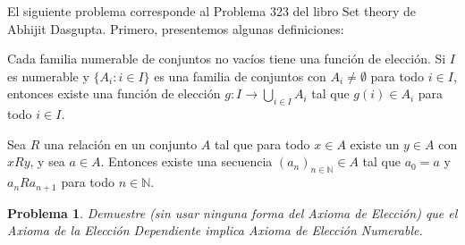 \documentclass[a4,10pt]{aleph-notas}
\newtheorem*{prob}{Problema}
\begin{document}
\encabezado

\noindent
El siguiente problema corresponde al Problema 323 del libro Set theory de Abhijit Dasgupta. Primero, presentemos algunas definiciones:

\begin{defi}
    Cada familia numerable de conjuntos no vacíos tiene una función de elección. Si \( I \) es numerable y \( \{A_i : i \in I\} \) es una familia de conjuntos con \( A_i \neq \emptyset \) para todo \( i \in I \), entonces existe una función de elección \( g : I \rightarrow \bigcup_{i \in I} A_i \) tal que \( g(i) \in A_i \) para todo \( i \in I \).
\end{defi}

\begin{defi}
    Sea \( R \) una relación en un conjunto \( A \) tal que para todo \( x \in A \) existe un \( y \in A \) con \( xRy \), y sea \( a \in A \). Entonces existe una secuencia \( (a_n)_{n \in \mathbb{N}} \in A \) tal que \( a_0 = a \) y \( a_n R a_{n+1} \) para todo \( n \in \mathbb{N} \).
\end{defi}


\begin{prob}
    Demuestre (sin usar ninguna forma del Axioma de Elección) que el Axioma de la Elección Dependiente implica Axioma de Elección Numerable.
\end{prob}
\end{document}
